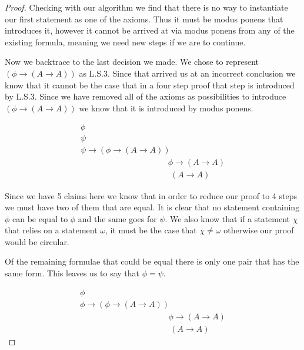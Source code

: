 \documentclass{article}
\begin{document}
\begin{proof}
Checking with our algorithm we find that there is no way to instantiate our first statement as one of the axioms.
Thus it must be modus ponens that introduces it, however it cannot be arrived at via modus ponens from any of the existing formula, meaning we need new steps if we are to continue.

Now we backtrace to the last decision we made.
We chose to represent $(\phi \rightarrow (A \rightarrow A))$ as L.S.3.
Since that arrived us at an incorrect conclusion we know that it cannot be the case that in a four step proof that step is introduced by L.S.3.
Since we have removed all of the axioms as possibilities to introduce $(\phi \rightarrow (A \rightarrow A))$ we know that it is introduced by modus ponens.

\begin{gather*}
\phi \tag{$\gamma$}\\
\psi \tag{$\epsilon$}\\
\psi \rightarrow (\phi \rightarrow (A \rightarrow A)) \tag{$\delta$}\\
\phantom{\text{Modus Ponens ($\epsilon$, $\delta$) ($\beta$)}} \phi \rightarrow (A \rightarrow A) \tag*{Modus Ponens ($\epsilon$, $\delta$) ($\beta$)} \\
\phantom{\text{Modus Ponens ($\gamma$, $\beta$) ($\alpha$)}} (A \rightarrow A) \tag*{Modus Ponens ($\gamma$, $\beta$) ($\alpha$)}
\end{gather*}

Since we have 5 claims here we know that in order to reduce our proof to 4 steps we must have two of them that are equal.
It is clear that no statement containing $\phi$ can be equal to $\phi$ and the same goes for $\psi$.
We also know that if a statement $\chi$ that relies on a statement $\omega$, it must be the case that $\chi \neq \omega$ otherwise our proof would be circular.

Of the remaining formulae that could be equal there is only one pair that has the same form.
This leaves us to say that $\phi = \psi$. 

\begin{gather*}
\phi \tag{$\gamma$}\\
\phi \rightarrow (\phi \rightarrow (A \rightarrow A)) \tag{$\delta$}\\
\phantom{\text{Modus Ponens ($\gamma$, $\delta$) ($\beta$)}} \phi \rightarrow (A \rightarrow A) \tag*{Modus Ponens ($\gamma$, $\delta$) ($\beta$)} \\
\phantom{\text{Modus Ponens ($\gamma$, $\beta$) ($\alpha$)}} (A \rightarrow A) \tag*{Modus Ponens ($\gamma$, $\beta$) ($\alpha$)}
\end{gather*}


\end{proof}
\end{document}
